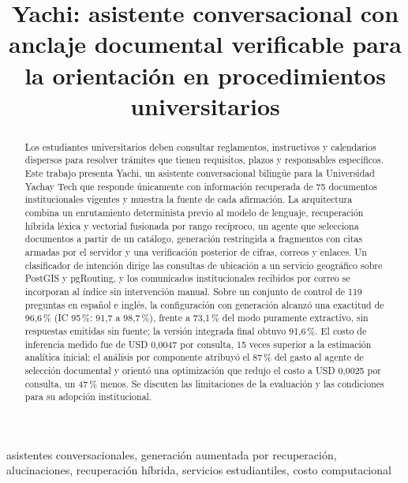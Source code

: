 \documentclass[conference]{IEEEtran}
\begin{document}
\title{Yachi: asistente conversacional con anclaje documental verificable para la orientación en procedimientos universitarios}

\author{
}

\maketitle

\begin{abstract}
Los estudiantes universitarios deben consultar reglamentos, instructivos y calendarios dispersos para resolver trámites que tienen requisitos, plazos y responsables específicos. Este trabajo presenta Yachi, un asistente conversacional bilingüe para la Universidad Yachay Tech que responde únicamente con información recuperada de 75 documentos institucionales vigentes y muestra la fuente de cada afirmación. La arquitectura combina un enrutamiento determinista previo al modelo de lenguaje, recuperación híbrida léxica y vectorial fusionada por rango recíproco, un agente que selecciona documentos a partir de un catálogo, generación restringida a fragmentos con citas armadas por el servidor y una verificación posterior de cifras, correos y enlaces. Un clasificador de intención dirige las consultas de ubicación a un servicio geográfico sobre PostGIS y pgRouting, y los comunicados institucionales recibidos por correo se incorporan al índice sin intervención manual. Sobre un conjunto de control de 119 preguntas en español e inglés, la configuración con generación alcanzó una exactitud de 96,6\,\% (IC 95\,\%: 91,7 a 98,7\,\%), frente a 73,1\,\% del modo puramente extractivo, sin respuestas emitidas sin fuente; la versión integrada final obtuvo 91,6\,\%. El costo de inferencia medido fue de USD 0,0047 por consulta, 15 veces superior a la estimación analítica inicial; el análisis por componente atribuyó el 87\,\% del gasto al agente de selección documental y orientó una optimización que redujo el costo a USD 0,0025 por consulta, un 47\,\% menos. Se discuten las limitaciones de la evaluación y las condiciones para su adopción institucional.
\end{abstract}

\begin{IEEEkeywords}
asistentes conversacionales, generación aumentada por recuperación, alucinaciones, recuperación híbrida, servicios estudiantiles, costo computacional
\end{IEEEkeywords}
\end{document}
